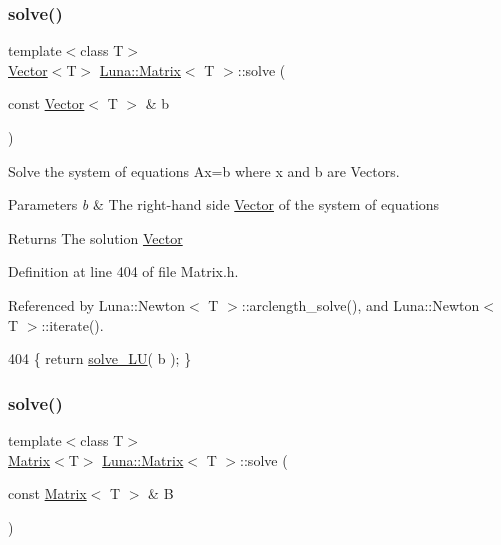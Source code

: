\subsubsection{\texorpdfstring{solve()}{solve()}\hspace{0.1cm}{\footnotesize\ttfamily [1/2]}}
{\footnotesize\ttfamily template$<$class T$>$ \\
\hyperlink{classLuna_1_1Vector}{Vector}$<$T$>$ \hyperlink{classLuna_1_1Matrix}{Luna\+::\+Matrix}$<$ T $>$\+::solve (\begin{DoxyParamCaption}\item[{const \hyperlink{classLuna_1_1Vector}{Vector}$<$ T $>$ \&}]{b }\end{DoxyParamCaption})\hspace{0.3cm}{\ttfamily [inline]}}



Solve the system of equations Ax=b where x and b are Vectors. 


\begin{DoxyParams}{Parameters}
{\em b} & The right-\/hand side \hyperlink{classLuna_1_1Vector}{Vector} of the system of equations \\
\hline
\end{DoxyParams}
\begin{DoxyReturn}{Returns}
The solution \hyperlink{classLuna_1_1Vector}{Vector} 
\end{DoxyReturn}


Definition at line 404 of file Matrix.\+h.



Referenced by Luna\+::\+Newton$<$ T $>$\+::arclength\+\_\+solve(), and Luna\+::\+Newton$<$ T $>$\+::iterate().


\begin{DoxyCode}
404 \{ \textcolor{keywordflow}{return} \hyperlink{classLuna_1_1Matrix_a9e065767864b479a535c4eccce35147d}{solve\_LU}( b ); \}
\end{DoxyCode}
\mbox{\label{classLuna_1_1Matrix_ac1793bde8e6a66d6ba1a094d36deca18}} 
\subsubsection{\texorpdfstring{solve()}{solve()}\hspace{0.1cm}{\footnotesize\ttfamily [2/2]}}
{\footnotesize\ttfamily template$<$class T$>$ \\
\hyperlink{classLuna_1_1Matrix}{Matrix}$<$T$>$ \hyperlink{classLuna_1_1Matrix}{Luna\+::\+Matrix}$<$ T $>$\+::solve (\begin{DoxyParamCaption}\item[{const \hyperlink{classLuna_1_1Matrix}{Matrix}$<$ T $>$ \&}]{B }\end{DoxyParamCaption})\hspace{0.3cm}{\ttfamily [inline]}}



